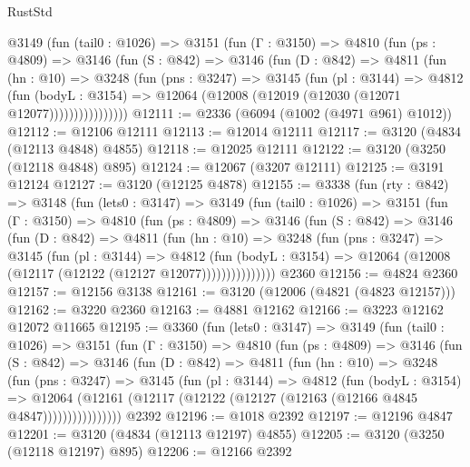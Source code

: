 \begin{lexlean}{RustStd}
\begin{coremodule}
        @3149
          (fun (tail0 : @1026) =>
          @3151
            (fun (Γ : @3150) =>
            @4810
              (fun (ps : @4809) =>
              @3146
                (fun (S : @842) =>
                @3146
                  (fun (D : @842) =>
                  @4811
                    (fun (hn : @10) =>
                    @3248
                      (fun (pns : @3247) =>
                      @3145
                        (fun (pl : @3144) =>
                        @4812
                          (fun (bodyL : @3154) =>
                          @12064 (@12008 (@12019 (@12030 (@12071 @12077))))))))))))))))
@12111 := @2336 (@6094 (@1002 (@4971 @961) @1012))
@12112 := @12106 @12111
@12113 := @12014 @12111
@12117 := @3120 (@4834 (@12113 @4848) @4855)
@12118 := @12025 @12111
@12122 := @3120 (@3250 (@12118 @4848) @895)
@12124 := @12067 (@3207 @12111)
@12125 := @3191 @12124
@12127 := @3120 (@12125 @4878)
@12155 := @3338
    (fun (rty : @842) =>
    @3148
      (fun (lets0 : @3147) =>
      @3149
        (fun (tail0 : @1026) =>
        @3151
          (fun (Γ : @3150) =>
          @4810
            (fun (ps : @4809) =>
            @3146
              (fun (S : @842) =>
              @3146
                (fun (D : @842) =>
                @4811
                  (fun (hn : @10) =>
                  @3248
                    (fun (pns : @3247) =>
                    @3145
                      (fun (pl : @3144) =>
                      @4812
                        (fun (bodyL : @3154) =>
                        @12064 (@12008 (@12117 (@12122 (@12127 @12077)))))))))))))))
    @2360
@12156 := @4824 @2360
@12157 := @12156 @3138
@12161 := @3120 (@12006 (@4821 (@4823 @12157)))
@12162 := @3220 @2360
@12163 := @4881 @12162
@12166 := @3223 @12162 @12072 @11665
@12195 := @3360
    (fun (lets0 : @3147) =>
    @3149
      (fun (tail0 : @1026) =>
      @3151
        (fun (Γ : @3150) =>
        @4810
          (fun (ps : @4809) =>
          @3146
            (fun (S : @842) =>
            @3146
              (fun (D : @842) =>
              @4811
                (fun (hn : @10) =>
                @3248
                  (fun (pns : @3247) =>
                  @3145
                    (fun (pl : @3144) =>
                    @4812
                      (fun (bodyL : @3154) =>
                      @12064
                        (@12161 (@12117 (@12122 (@12127 (@12163 (@12166 @4845 @4847))))))))))))))))
    @2392
@12196 := @1018 @2392
@12197 := @12196 @4847
@12201 := @3120 (@4834 (@12113 @12197) @4855)
@12205 := @3120 (@3250 (@12118 @12197) @895)
@12206 := @12166 @2392

\end{coremodule}
\end{lexlean}

